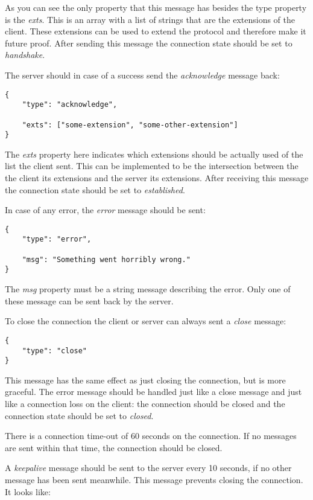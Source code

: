 \documentclass[11pt,a4paper]{article}
\begin{document}
As you can see the only property that this message has besides the type property is the \textit{exts}.
This is an array with a list of strings that are the extensions of the client.
These extensions can be used to extend the protocol and therefore make it future proof.
After sending this message the connection state should be set to \textit{handshake}.

The server should in case of a success send the \textit{acknowledge} message back:

\begin{verbatim}
{
    "type": "acknowledge",

    "exts": ["some-extension", "some-other-extension"]
}
\end{verbatim}

The \textit{exts} property here indicates which extensions should be actually used of the list the client sent.
This can be implemented to be the intersection between the the client its extensions and the server its extensions.
After receiving this message the connection state should be set to \textit{established}.

In case of any error, the \textit{error} message should be sent:

\begin{verbatim}
{
    "type": "error",

    "msg": "Something went horribly wrong."
}
\end{verbatim}

The \textit{msg} property must be a string message describing the error.
Only one of these message can be sent back by the server.

To close the connection the client or server can always sent a \textit{close} message:

\begin{verbatim}
{
    "type": "close"
}
\end{verbatim}

This message has the same effect as just closing the connection, but is more graceful.
The error message should be handled just like a close message and just like a connection loss on the client: the connection should be closed and the connection state should be set to \textit{closed}.

There is a connection time-out of 60 seconds on the connection.
If no messages are sent within that time, the connection should be closed.

A \textit{keepalive} message should be sent to the server every 10 seconds, if no other message has been sent meanwhile.
This message prevents closing the connection. It looks like:
\end{document}
